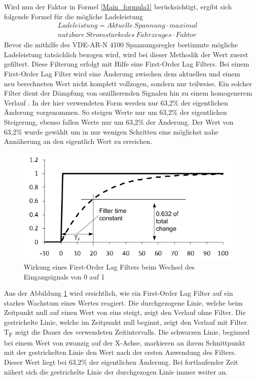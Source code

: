  Wird nun der Faktor in Formel \ref{Main_formula1} berücksichtigt, ergibt sich folgende Formel für die mögliche Ladeleistung
\begin{align}
	Ladeleistung = Aktuelle\ Spannung \cdot maximal\ \label{Main_formula3}\\
	nutzbare\ Stromst\ddot{a}rke des\ Fahrzeuges \cdot Faktor \nonumber
\end{align}
Bevor die mithilfe des VDE-AR-N 4100 Spannungsregler bestimmte mögliche Ladeleistung tatsächlich bezogen wird, wird bei dieser Methodik der Wert zuerst gefiltert. Diese Filterung erfolgt mit Hilfe eine First-Order Lag Filters. Bei einem First-Order Lag Filter wird eine Änderung zwischen dem aktuellen und einem neu berechneten Wert nicht komplett vollzogen, sondern nur teilweise. Ein solcher Filter dient der Dämpfung von oszillierenden Signalen hin zu einem homogenerem Verlauf . In der hier verwendeten Form werden nur 63,2\% der eigentlichen Änderung vorgenommen. So steigen Werte nur um 63,2\% der eigentlichen Steigerung, ebenso fallen Werte nur um 63,2\% der Änderung. Der Wert von 63,2\% wurde gewählt um in nur wenigen Schritten eine möglichst nahe Annäherung an den eigentlich Wert zu erreichen.
\begin{figure}[htb]
	\includegraphics[scale=0.75]{img/lag_Filter.png}
	\caption{Wirkung eines First-Order Lag Filters beim Wechsel des Eingangsignals von 0 auf 1}
	\label{Abb_lag_filter}
\end{figure}

Aus der Abbildung \ref{Abb_lag_filter} wird ersichtlich, wie ein First-Order Lag Filter auf ein starkes Wachstum eines Wertes reagiert. Die durchgezogene Linie, welche beim Zeitpunkt null auf einen Wert von eins steigt, zeigt den Verlauf ohne Filter. Die gestrichelte Linie, welche im Zeitpunkt null beginnt, zeigt den Verlauf mit Filter. T\textsubscript{F} zeigt die Dauer des verwendeten Zeitintervalls. Die schwarzen Linie, beginned bei einem Wert von zwanzig auf der X-Achse, markieren an ihrem Schnittpunkt  mit der gestrichelten Linie den Wert nach der ersten Anwendung des Filters. Dieser Wert liegt bei 63,2\% der eigentlichen Änderung. Bei fortlaufender Zeit nähert sich die gestrichelte Linie der durchgezogen Linie immer weiter an.

